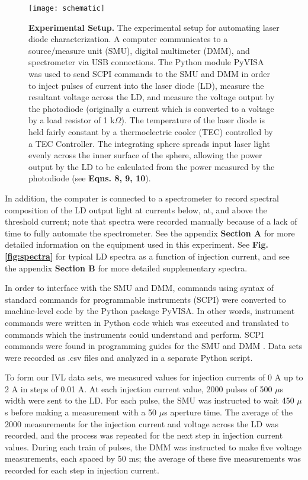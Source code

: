 \documentclass[9pt,twocolumn,twoside]{osajnl}
\begin{document}
\begin{figure}[H]
\centering
\texttt{[image: schematic]}
\caption{\textbf{Experimental Setup.} The experimental setup for automating laser diode characterization. A computer communicates to a source/measure unit (SMU), digital multimeter (DMM), and spectrometer via USB connections. The Python module PyVISA was used to send SCPI commands to the SMU and DMM in order to inject pulses of current into the laser diode (LD), measure the resultant voltage across the LD, and measure the voltage output by the photodiode (originally a current which is converted to a voltage by a load resistor of 1 k$\Omega$). The temperature of the laser diode is held fairly constant by a thermoelectric cooler (TEC) controlled by a TEC Controller. The integrating sphere spreads input laser light evenly across the inner surface of the sphere, allowing the power output by the LD to be calculated from the power measured by the photodiode (see \textbf{Eqns. 8, 9, 10}).}
\label{fig:schematic}
\end{figure}

In addition, the computer is connected to a spectrometer to record spectral composition of the LD output light at currents below, at, and above the threshold current; note that spectra were recorded manually because of a lack of time to fully automate the spectrometer. See the appendix \textbf{Section A} for more detailed information on the equipment used in this experiment. See \textbf{Fig. \ref{fig:spectra}} for typical LD spectra as a function of injection current, and see the appendix \textbf{Section B} for more detailed supplementary spectra.

In order to interface with the SMU and DMM, commands using syntax of standard commands for programmable instruments (SCPI) were converted to machine-level code by the Python package PyVISA. In other words, instrument commands were written in Python code which was executed and translated to commands which the instruments could understand and perform. SCPI commands were found in programming guides for the SMU and DMM \cite{SMUprogramguide,DMMprogramguide}. Data sets were recorded as .csv files and analyzed in a separate Python script.

To form our IVL data sets, we measured values for injection currents of 0 A up to 2 A in steps of 0.01 A. At each injection current value, 2000 pulses of 500 $\mu$s width were sent to the LD. For each pulse, the SMU was instructed to wait 450 $\mu$s before making a measurement with a 50 $\mu$s aperture time. The average of the 2000 measurements for the injection current and voltage across the LD was recorded, and the process was repeated for the next step in injection current values. During each train of pulses, the DMM was instructed to make five voltage measurements, each spaced by 50 ms; the average of these five measurements was recorded for each step in injection current.
\end{document}
